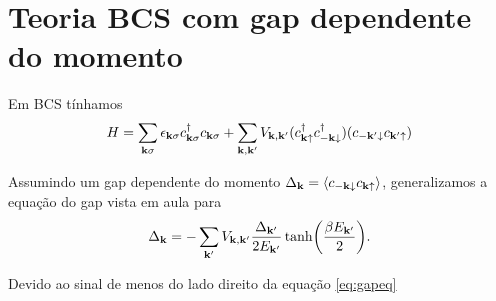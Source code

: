 \documentclass[a4paper,10pt]{article}
\begin{document}
\section{Teoria BCS com gap dependente do momento}

Em BCS tínhamos
$$
H = \sum_{\vb{k}\sigma} \epsilon_{\vb{k}\sigma} c_{\vb{k}\sigma}^\dagger c_{\vb{k}\sigma} +
\sum_{\vb{k},\vb{k}'} V_{\vb{k},\vb{k}'} (c_{\vb{k}\uparrow}^\dagger c_{-\vb{k}\downarrow}^\dagger) (c_{-\vb{k}'\downarrow} c_{\vb{k}'\uparrow})
$$

Assumindo um gap dependente do momento $\Delta_{\k} = \ev{c_{-\k\down}c_{\k\up}}$, generalizamos a equação do gap vista em aula para
\begin{equation} \label{eq:gapeq}
\Delta_{\vb{k}} = - \sum_{\vb{k}'} V_{\vb{k},\vb{k}'} \frac{\Delta_{\vb{k}'}}{2 E_{\vb{k}'}} \tanh(\frac{\beta E_{\vb{k}'}}{2}).
\end{equation}

Devido ao sinal de menos do lado direito da equação \ref{eq:gapeq}
\end{document}
